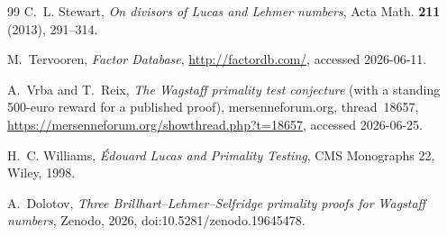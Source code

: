 \documentclass[11pt]{amsart}
\theoremstyle{plain}
\theoremstyle{definition}
\theoremstyle{remark}
\numberwithin{equation}{section}
\begin{document}
\begin{thebibliography}{99}
 C.~L. Stewart, \emph{On divisors of Lucas and Lehmer numbers}, Acta Math. \textbf{211} (2013), 291--314.

 M.~Tervooren, \emph{Factor Database}, \url{http://factordb.com/}, accessed 2026-06-11.

 A.~Vrba and T.~Reix, \emph{The Wagstaff primality test conjecture} (with a standing 500-euro reward for a published proof), mersenneforum.org, thread~18657, \url{https://mersenneforum.org/showthread.php?t=18657}, accessed 2026-06-25.

 H.~C. Williams, \emph{\'Edouard Lucas and Primality Testing}, CMS Monographs 22, Wiley, 1998.

 A.~Dolotov, \emph{Three Brillhart--Lehmer--Selfridge primality proofs for Wagstaff numbers}, Zenodo, 2026, doi:10.5281/zenodo.19645478.

\end{thebibliography}
\end{document}
